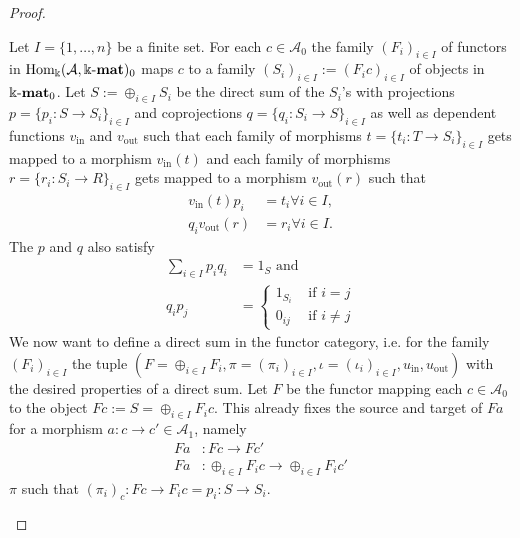 \begin{proof}
\begin{enumerate}
\begin{subproof}[Proof of (ii)]
Let $I = \{1,\dots,n\}$ be a finite set. For each $c \in \mathcal{A}_{0}$ the family $(F_{i})_{i\in I}$ of functors in $\mathrm{Hom_{\Bbbk}}(\mathcal{A},\Bbbk\textnormal{-}\mathbf{mat})_{0}$ maps $c$ to a
family $(S_{i})_{i\in I} := (F_{i}c)_{i\in I}$ of objects in $\Bbbk\textnormal{-}\mathbf{mat}_{0}$. Let $S := \oplus_{i\in I} S_{i}$ be the direct sum of the $S_{i}$'s with projections
$p = \{ p_{i} : S \rightarrow S_{i}\}_{i\in I}$ and coprojections $q = \{ q_{i} : S_{i} \rightarrow S\}_{i\in I}$ as well as dependent functions
$v_{\text{in}}$ and $v_{\text{out}}$ such that each family of morphisms $t = \{ t_{i} : T \rightarrow S_{i}\}_{i\in I}$ gets mapped to a
morphism $v_{\text{in}}(t)$ and each family of morphisms $r = \{ r_{i} : S_{i} \rightarrow R\}_{i\in I}$ gets mapped to a
morphism $v_{\text{out}}(r)$ such that
\begin{align*}
v_{\text{in}}(t) p_{i} &= t_{i} \forall i\in I, \\
q_{i} v_{\text{out}}(r) &= r_{i} \forall i\in I.
\end{align*}
The $p$ and $q$ also satisfy
\begin{align*}
\sum_{i\in I} p_{i} q_{i} &= 1_{S} \text{  and  } \\
q_{i} p_{j} &= \begin{cases}
            1_{S_{i}} & \text{ if } i = j \\
            0_{ij} & \text{ if } i \neq j
        \end{cases}
\end{align*}
We now want to define a direct sum in the functor category, i.e. for the family $(F_{i})_{i\in I}$ the tuple
$(F = \oplus_{i\in I} F_{i}, \pi = (\pi_{i})_{i\in I}, \iota = (\iota_{i})_{i\in I}, u_{\text{in}}, u_{\text{out}})$ with the desired properties of a direct sum.
Let $F$ be the functor mapping each $c\in \mathcal{A}_{0}$ to the object $Fc := S = \oplus_{i\in I} F_{i}c$. This already fixes the source and target of
$Fa$ for a morphism $a : c \rightarrow c' \in \mathcal{A}_{1}$, namely
\begin{align*}
Fa &: Fc \rightarrow Fc' \\
Fa &: \oplus_{i\in I} F_{i}c \rightarrow \oplus_{i\in I} F_{i}c'
\end{align*}
$\pi$ such that $(\pi_{i})_{c} : Fc \rightarrow F_{i}c = p_{i} : S \rightarrow S_{i}$.
\end{subproof}


\end{enumerate}
\end{proof}
